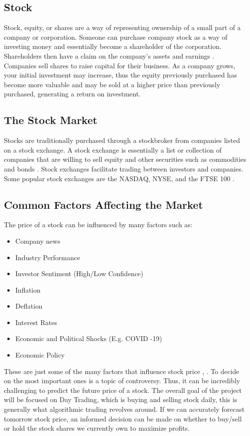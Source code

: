 \subsection{Stock}

\noindent Stock, equity, or shares are a way of representing ownership of a small part of a company or corporation. Someone can purchase company stock as a way of investing money and essentially become a shareholder of the corporation. Shareholders then have a claim on the company’s assets and earnings \cite{stock_def}. Companies sell shares to raise capital for their business. As a company grows, your initial investment may increase, thus the equity previously purchased has become more valuable and may be sold at a higher price than previously purchased, generating a return on investment.

\subsection{The Stock Market}
\noindent Stocks are traditionally purchased through a stockbroker from companies listed on a stock exchange. A stock exchange is essentially a list or collection of companies that are willing to sell equity and other securities such as commodities and bonds \cite{stock_def}. Stock exchanges facilitate trading between investors and companies. Some popular stock exchanges are the NASDAQ, NYSE, and the FTSE 100 \cite{stock_exch}. 

\subsection{Common Factors Affecting the Market}
\noindent The price of a stock can be influenced by many factors such as:

\begin{itemize}
    \item Company news
    \item Industry Performance
    \item Investor Sentiment (High/Low Confidence)
    \item Inflation
    \item Deflation
    \item Interest Rates
    \item Economic and Political Shocks (E.g. COVID -19)
    \item Economic Policy
\end{itemize}

\noindent These are just some of the many factors that influence stock price \cite{factors}, \cite{factors2}. To decide on the most important ones is a topic of controversy. Thus, it can be incredibly challenging to predict the future price of a stock. The overall goal of the project will be focused on Day Trading, which is buying and selling stock daily, this is generally what algorithmic trading revolves around. If we can accurately forecast tomorrow stock price, an informed decision can be made on whether to buy/sell or hold the stock shares we currently own to maximize
profits.

